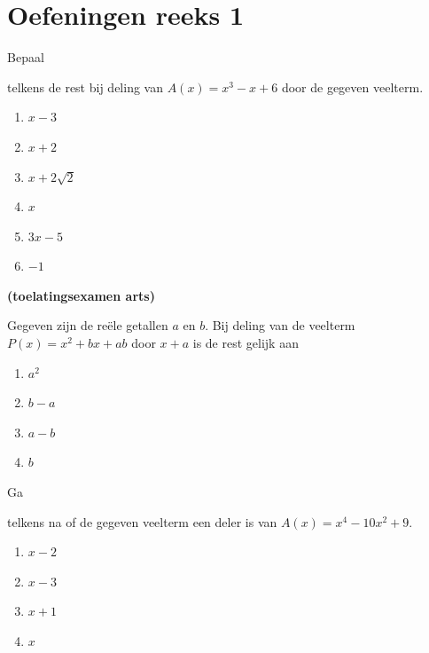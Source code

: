 \documentclass{ximera}
\begin{document}
\section*{Oefeningen reeks 1}
\begin{Oefening}\setcounter{enumi}{1}
\hypertarget{oef3.1}{Bepaal} telkens de rest bij deling van $A(x) = x^3-x+6$ door de gegeven veelterm.
\begin{multicols}{2}
\begin{enumerate}

\item
$x-3$
\item
$x+2$
\item
$x + 2\sqrt{2}$
\item
$x$
\item
$3x-5$
\item
$-1$
\end{enumerate}
\end{multicols}
\end{Oefening}

\begin{Oefening}\setcounter{enumi}{2}
\hypertarget{oef3.2}{{\bf (toelatingsexamen arts)}} 
Gegeven zijn de re\"ele getallen $a$ en $b$. Bij deling van de veelterm $P(x) = x^2 + bx + ab$ door $x+a$ is de rest gelijk aan
\begin{multicols}{4}
\begin{enumerate}

\item 
$a^2$
\item 
$b-a$ 
\item 
$a-b$ 
\item 
$b$
\end{enumerate}
\end{multicols}
\end{Oefening}

\begin{Oefening}\setcounter{enumi}{3}
\hypertarget{oef3.3}{Ga} telkens na of de gegeven veelterm een deler is van $A(x) = x^4 - 10x^2 + 9$. 
\begin{multicols}{2}
\begin{enumerate}

\item
$x-2$
\item
$x-3$
\item
$x+1$
\item
$x$
\end{enumerate}
\end{multicols}
\end{Oefening}
\end{document}
